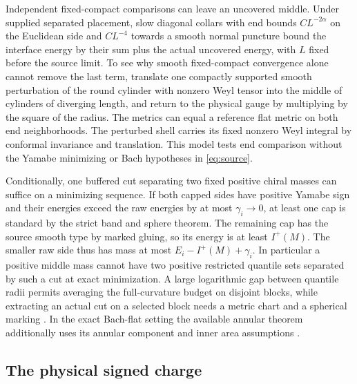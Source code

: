 \documentclass[11pt]{article}
\theoremstyle{definition}
\theoremstyle{remark}
\begin{document}
Independent fixed-compact comparisons can leave an uncovered middle. Under supplied separated placement, slow diagonal collars with end bounds \(CL^{-2\alpha}\) on the Euclidean side and \(CL^{-4}\) towards a smooth normal puncture bound the interface energy by their sum plus the actual uncovered energy, with \(L\) fixed before the source limit. To see why smooth fixed-compact convergence alone cannot remove the last term, translate one compactly supported smooth perturbation of the round cylinder with nonzero Weyl tensor into the middle of cylinders of diverging length, and return to the physical gauge by multiplying by the square of the radius. The metrics can equal a reference flat metric on both end neighborhoods. The perturbed shell carries its fixed nonzero Weyl integral by conformal invariance and translation. This model tests end comparison without the Yamabe minimizing or Bach hypotheses in \eqref{eq:source}.

Conditionally, one buffered cut separating two fixed positive chiral masses can suffice on a minimizing sequence. If both capped sides have positive Yamabe sign and their energies exceed the raw energies by at most \(\gamma_i\to0\), at least one cap is standard by the strict band and sphere theorem. The remaining cap has the source smooth type by marked gluing, so its energy is at least \(I^+(M)\). The smaller raw side thus has mass at most \(E_i-I^+(M)+\gamma_i\). In particular a positive middle mass cannot have two positive restricted quantile sets separated by such a cut at exact minimization. A large logarithmic gap between quantile radii permits averaging the full-curvature budget on disjoint blocks, while extracting an actual cut on a selected block needs a metric chart and a spherical marking \cite{Baker2026MarkedNecks}. In the exact Bach-flat setting the available annular theorem additionally uses its annular component and inner area assumptions \cite[Theorem 3.1]{ChangQingYang2006Gap}.

\subsection{The physical signed charge}
\end{document}
